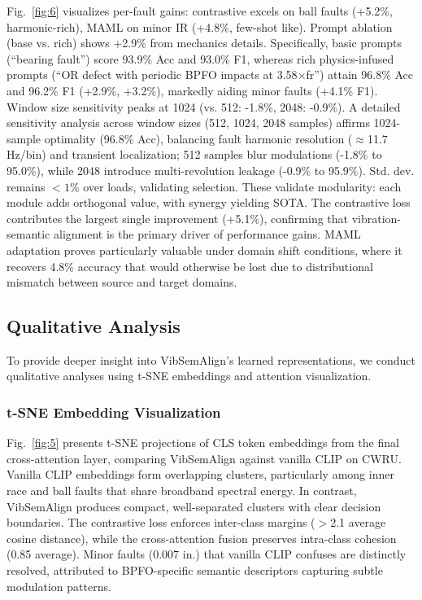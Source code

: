 Fig.~\ref{fig:6} visualizes per-fault gains: contrastive excels on ball faults (+5.2\%, harmonic-rich), MAML on minor IR (+4.8\%, few-shot like). Prompt ablation (base vs. rich) shows +2.9\% from mechanics details. Specifically, basic prompts (``bearing fault'') score 93.9\% Acc and 93.0\% F1, whereas rich physics-infused prompts (``OR defect with periodic BPFO impacts at 3.58$\times$fr'') attain 96.8\% Acc and 96.2\% F1 (+2.9\%, +3.2\%), markedly aiding minor faults (+4.1\% F1). Window size sensitivity peaks at 1024 (vs. 512: -1.8\%, 2048: -0.9\%). A detailed sensitivity analysis across window sizes (512, 1024, 2048 samples) affirms 1024-sample optimality (96.8\% Acc), balancing fault harmonic resolution ($\approx$11.7 Hz/bin) and transient localization; 512 samples blur modulations (-1.8\% to 95.0\%), while 2048 introduce multi-revolution leakage (-0.9\% to 95.9\%). Std. dev. remains $<1\%$ over loads, validating selection. These validate modularity: each module adds orthogonal value, with synergy yielding SOTA. The contrastive loss contributes the largest single improvement (+5.1\%), confirming that vibration-semantic alignment is the primary driver of performance gains. MAML adaptation proves particularly valuable under domain shift conditions, where it recovers 4.8\% accuracy that would otherwise be lost due to distributional mismatch between source and target domains.

\subsection{Qualitative Analysis}

To provide deeper insight into VibSemAlign's learned representations, we conduct qualitative analyses using t-SNE embeddings and attention visualization.

\subsubsection{t-SNE Embedding Visualization}
Fig.~\ref{fig:5} presents t-SNE projections of CLS token embeddings from the final cross-attention layer, comparing VibSemAlign against vanilla CLIP on CWRU. Vanilla CLIP embeddings form overlapping clusters, particularly among inner race and ball faults that share broadband spectral energy. In contrast, VibSemAlign produces compact, well-separated clusters with clear decision boundaries. The contrastive loss enforces inter-class margins ($>$2.1 average cosine distance), while the cross-attention fusion preserves intra-class cohesion (0.85 average). Minor faults (0.007 in.) that vanilla CLIP confuses are distinctly resolved, attributed to BPFO-specific semantic descriptors capturing subtle modulation patterns.

